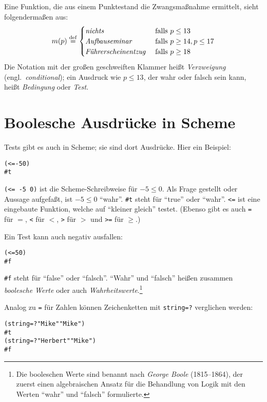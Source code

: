 Eine Funktion, die  aus einem Punktestand die Zwangsmaßnahme ermittelt,
sieht folgendermaßen aus:
%
\begin{displaymath}
  m(p) \stackrel{\rm def}{=}
  \begin{cases}
    \textit{nichts} & \textrm{falls $p \leq 13$}
    \\
    \textit{Aufbauseminar} & \textrm{falls $p \geq 14, p \leq 17$}
    \\
    \textit{Führerscheinentzug } & \textrm{falls $p \geq 18$}
  \end{cases}
\end{displaymath}
%
Die Notation mit der großen geschweiften Klammer heißt
\textit{Verzweigung} (engl.\
\textit{conditional}); ein Ausdruck wie $p\leq 13$,
der wahr oder falsch sein kann,
heißt \textit{Bedingung} oder
\textit{Test}.

\section{Boolesche Ausdrücke in Scheme}

Tests gibt es auch in Scheme; sie sind dort Ausdrücke.
Hier ein Beispiel:
%
\begin{alltt}
(<= -5 0)
\evalsto{} #t
\end{alltt}
%
\texttt{(<= -5 0)} ist die Scheme-Schreibweise für $-5 \leq 0$.  Als Frage
gestellt oder Aussage aufgefaßt, ist $-5 \leq 0$ "`wahr"'.
\verb|#t| steht für "`true"' oder
"`wahr\index{wahr}"'.  \texttt{<=}\index{<=@\texttt{<=}} ist eine
eingebaute Funktion, welche auf "`kleiner gleich"' testet.  (Ebenso
gibt es auch \texttt{=}\index{=@\texttt{=}} für $=$, 
\texttt{<} für $<$,
\texttt{>} für $>$ und
\texttt{>=} für $\geq$.)

Ein Test kann auch negativ ausfallen:
%
\begin{alltt}
(<= 5 0)
\evalsto{} #f
\end{alltt}
%
\verb|#f| steht für "`false"' oder "`falsch"'.
"`Wahr"' und "`falsch"' heißen zusammen \textit{boolesche
  Werte} oder auch
\textit{Wahrheitswerte}.\footnote{Die booleschen
  Werte sind benannt nach \textit{George Boole}
  (1815--1864), der zuerst einen algebraischen Ansatz für die
  Behandlung von Logik mit den Werten "`wahr"' und "`falsch"'
  formulierte.}

Analog zu \texttt{=} für Zahlen können Zeichenketten mit
\texttt{string=?} verglichen werden:
\begin{alltt}
(string=? "Mike" "Mike")
\evalsto{} #t
(string=? "Herbert" "Mike")
\evalsto{} #f
\end{alltt}

